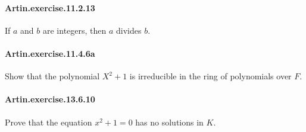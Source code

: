 \documentclass{article}
\begin{document}

\paragraph{Artin.exercise.11.2.13} If $a$ and $b$ are integers, then $a$ divides $b$.

\paragraph{Artin.exercise.11.4.6a} Show that the polynomial $X ^ 2 + 1$ is irreducible in the ring of polynomials over $F$.



\paragraph{Artin.exercise.13.6.10} Prove that the equation $x^2 + 1 = 0$ has no solutions in $K$.
\end{document}
